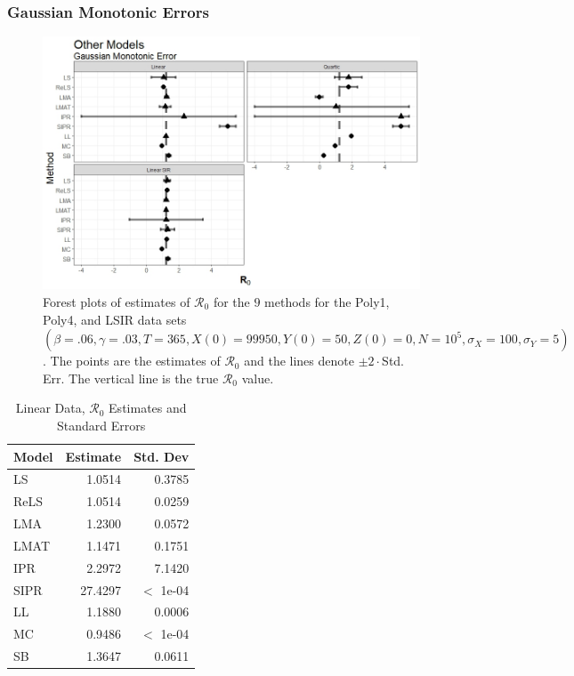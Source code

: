 \documentclass[12pt]{article}
\newcommand{\xxsir}{\ensuremath{9} } %
\newcommand{\rr}{\ensuremath{\mathcal{R}_0}}
\begin{document}
\subsubsection{Gaussian Monotonic Errors}

\begin{figure}[H]
	\begin{center}
		\includegraphics[scale=0.5]{images/other_nm.jpeg}
		\caption{Forest plots of estimates of $\rr$ for the \xxsir methods for the Poly1, Poly4, and LSIR data sets $(\beta=.06, \gamma=.03, T=365, X(0)=99950, Y(0)=50, Z(0)=0, N=10^5, \sigma_X=100, \sigma_Y=5)$.  The points are the estimates of $\rr$ and the lines denote $\pm 2\cdot $Std. Err.  The vertical line is the true $\rr$ value.}
	\end{center}
\end{figure}

\begin{table}[H]
	
	\centering
	\begin{tabular}[t]{l|r|r}
		\hline
		Model & Estimate & Std. Dev\\
		\hline
		LS & 1.0514 & 0.3785\\
		\hline
		ReLS & 1.0514 & 0.0259\\
		\hline
		LMA & 1.2300 & 0.0572\\
		\hline
		LMAT & 1.1471 & 0.1751\\
		\hline
		IPR & 2.2972 & 7.1420\\
		\hline
		SIPR & 27.4297 & $<$ 1e-04\\
		\hline
		LL & 1.1880 & 0.0006\\
		\hline
		MC & 0.9486 & $<$ 1e-04\\
		\hline
		SB & 1.3647 & 0.0611\\
		\hline
	\end{tabular}
	\caption{Linear Data, $\rr$ Estimates and Standard Errors}
\end{table}
\end{document}
